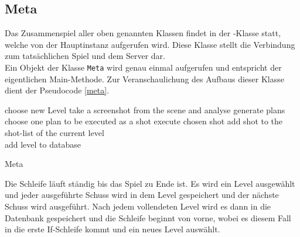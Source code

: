 \subsection{Meta}
Das Zusammenspiel aller oben genannten Klassen findet in der -Klasse statt, welche von der Hauptinstanz  aufgerufen wird. Diese Klasse stellt die Verbindung zum tatsächlichen Spiel und dem Server dar. \\
Ein Objekt der Klasse \texttt{Meta} wird genau einmal aufgerufen und entspricht der eigentlichen Main-Methode. Zur Veranschaulichung des Aufbaus dieser Klasse dient der Pseudocode \ref{meta}.

\begin{algorithm}[H]
  \begin{algorithmic}[1]
  \Loop
  		\State choose new Level
  	\EndIf
  	\State take a screenshot from the scene and analyse
  	\State generate plans
  	\State choose one plan to be executed as a shot
  	\State execute chosen shot
  	\State add shot to the shot-list of the current level
  	 \\
  		\hspace{2.5em} add level to database
  	\EndIf
  \EndLoop
  \end{algorithmic}
  \caption{Meta \label{meta}}
\end{algorithm}

Die Schleife läuft ständig bis das Spiel zu Ende ist. Es wird ein Level ausgewählt und jeder ausgeführte Schuss wird in dem Level gespeichert und der nächste Schuss wird ausgeführt. Nach jedem vollendeten Level wird es dann in die Datenbank gespeichert und die Schleife beginnt von vorne, wobei es diesem Fall in die erste If-Schleife kommt und ein neues Level auswählt.